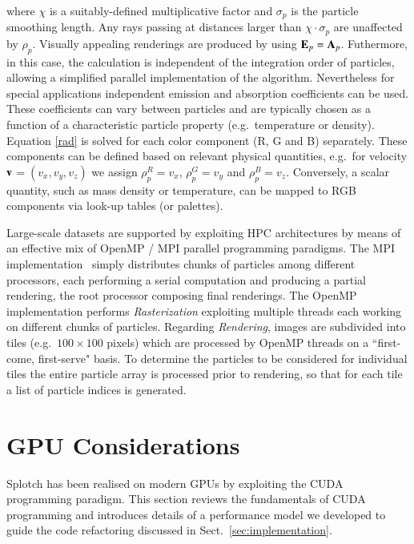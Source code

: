 \documentclass[preprint,5pt]{elsarticle}
\begin{document}
\begin{itemize}
where $\chi$ is a suitably-defined multiplicative factor and $\sigma_p$ is the particle smoothing length. Any rays passing at distances larger than $\chi\cdot\sigma_p$ are unaffected by $\rho_p$. Visually appealing renderings are produced by using ${\bf E}_p = {\bf A}_p$. Futhermore, in this case, the calculation is independent of the integration order of particles, allowing a simplified parallel implementation of the algorithm. Nevertheless for special applications independent emission and absorption coefficients can be used. These coefficients
can vary between particles and are typically chosen as a function of a characteristic
particle property (e.g.\ temperature or density).
Equation \eqref{rad} is solved for each color component (R, G and B) separately. These components can be defined based on relevant physical quantities, e.g.\ for velocity $\bf v$$=(v_x, v_y, v_z)$ we assign $\rho_p^{R}=v_x$, $\rho_p^{G}=v_y$ and $\rho_p^{B}=v_z$. Conversely, a scalar quantity, such as mass density or temperature, can be mapped to RGB components via look-up tables (or palettes). 
\end{itemize}
Large-scale datasets are supported by exploiting HPC architectures by means of an effective mix of OpenMP / MPI parallel programming paradigms. The MPI implementation~\cite{jin:high-performance}  simply distributes chunks of particles among different processors, each performing a serial computation and producing a partial rendering, the root processor composing final renderings. The OpenMP implementation performs {\it Rasterization} exploiting multiple threads each working on different chunks of particles. Regarding {\it Rendering}, images are subdivided into tiles (e.g.\ $100 \times 100$ pixels) which are processed by OpenMP threads on a ``first-come, first-serve" basis. To determine the particles to be considered for individual tiles the entire particle array is processed prior to rendering, so that for each tile a list of particle indices is generated.


\section{GPU Considerations}
\label{sec:gpu-code}

Splotch has been realised on modern GPUs by exploiting the CUDA programming paradigm. This section reviews the fundamentals of CUDA programming and introduces details of a performance model we developed to guide the code refactoring discussed in Sect.~\ref{sec:implementation}.  
\end{document}
